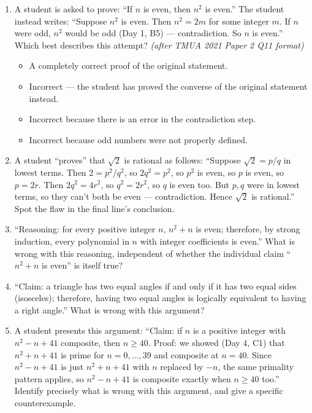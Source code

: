 \documentclass[11pt,a4paper]{article}
\begin{document}
\begin{enumerate}

\item A student is asked to prove: ``If $n$ is even, then $n^2$ is even.'' The student instead writes: ``Suppose $n^2$ is even. Then $n^2=2m$ for some integer $m$. If $n$ were odd, $n^2$ would be odd (Day 1, B5) --- contradiction. So $n$ is even.'' Which best describes this attempt? \textit{\small(after TMUA 2021 Paper 2 Q11 format)}
\begin{itemize}
\item[A)] A completely correct proof of the original statement.
\item[B)] Incorrect --- the student has proved the converse of the original statement instead.
\item[C)] Incorrect because there is an error in the contradiction step.
\item[D)] Incorrect because odd numbers were not properly defined.
\end{itemize}

\item A student ``proves'' that $\sqrt2$ is rational as follows: ``Suppose $\sqrt2=p/q$ in lowest terms. Then $2=p^2/q^2$, so $2q^2=p^2$, so $p^2$ is even, so $p$ is even, so $p=2r$. Then $2q^2=4r^2$, so $q^2=2r^2$, so $q$ is even too. But $p,q$ were in lowest terms, so they can't both be even --- contradiction. Hence $\sqrt2$ is rational.'' Spot the flaw in the final line's conclusion.

\item ``Reasoning: for every positive integer $n$, $n^2+n$ is even; therefore, by strong induction, every polynomial in $n$ with integer coefficients is even.'' What is wrong with this reasoning, independent of whether the individual claim ``$n^2+n$ is even'' is itself true?

\item ``Claim: a triangle has two equal angles if and only if it has two equal sides (isosceles); therefore, having two equal angles is logically equivalent to having a right angle.'' What is wrong with this argument?

\item A student presents this argument: ``Claim: if $n$ is a positive integer with $n^2-n+41$ composite, then $n\geq40$. Proof: we showed (Day 4, C1) that $n^2+n+41$ is prime for $n=0,\dots,39$ and composite at $n=40$. Since $n^2-n+41$ is just $n^2+n+41$ with $n$ replaced by $-n$, the same primality pattern applies, so $n^2-n+41$ is composite exactly when $n\geq40$ too.'' Identify precisely what is wrong with this argument, and give a specific counterexample.

\end{enumerate}

\end{document}
